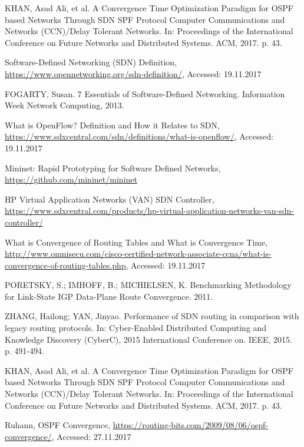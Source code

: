 \documentclass[conference]{IEEEtran}
\begin{document}
\ifCLASSOPTIONcaptionsoff
  \newpage
\fi


\begin{thebibliography}{1}
KHAN, Asad Ali, et al. A Convergence Time Optimization Paradigm for OSPF based Networks Through SDN SPF Protocol Computer Communications and Networks (CCN)/Delay Tolerant Networks. In: Proceedings of the International Conference on Future Networks and Distributed Systems. ACM, 2017. p. 43.

Software-Defined Networking (SDN) Definition, \url{https://www.opennetworking.org/sdn-definition/}, Accessed: 19.11.2017

FOGARTY, Susan. 7 Essentials of Software-Defined Networking. Information Week Network Computing, 2013.

What is OpenFlow? Definition and How it Relates to SDN, \url{https://www.sdxcentral.com/sdn/definitions/what-is-openflow/},  Accessed: 19.11.2017

Mininet: Rapid Prototyping for Software Defined Networks, \url{https://github.com/mininet/mininet}

HP Virtual Application Networks (VAN) SDN Controller, \url{https://www.sdxcentral.com/products/hp-virtual-application-networks-van-sdn-controller/}

What is Convergence of Routing Tables and What is Convergence Time, \url{http://www.omnisecu.com/cisco-certified-network-associate-ccna/what-is-convergence-of-routing-tables.php},  Accessed: 19.11.2017

PORETSKY, S.; IMHOFF, B.; MICHIELSEN, K. Benchmarking Methodology for Link-State IGP Data-Plane Route Convergence. 2011.

ZHANG, Hailong; YAN, Jinyao. Performance of SDN routing in comparison with legacy routing protocols. In: Cyber-Enabled Distributed Computing and Knowledge Discovery (CyberC), 2015 International Conference on. IEEE, 2015. p. 491-494.

KHAN, Asad Ali, et al. A Convergence Time Optimization Paradigm for OSPF based Networks Through SDN SPF Protocol Computer Communications and Networks (CCN)/Delay Tolerant Networks. In: Proceedings of the International Conference on Future Networks and Distributed Systems. ACM, 2017. p. 43.

Ruhann, OSPF Convergence, \url{https://routing-bits.com/2009/08/06/ospf-convergence/}, Accessed: 27.11.2017

\end{thebibliography}
\end{document}
